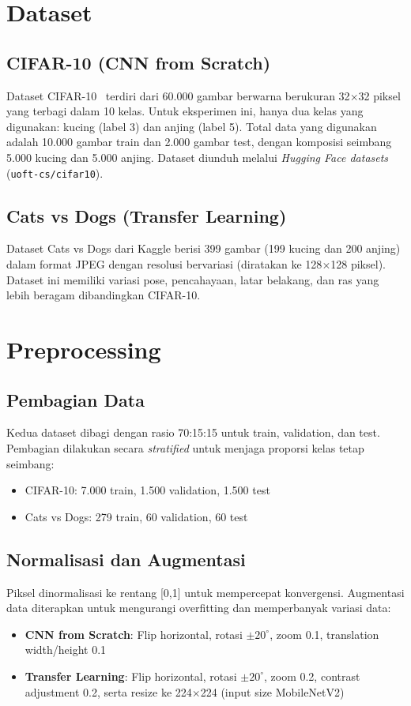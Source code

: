 \documentclass[conference]{IEEEtran}
\begin{document}
\section{Dataset}
\subsection{CIFAR-10 (CNN from Scratch)}
Dataset CIFAR-10~\cite{krizhevsky2009} terdiri dari 60.000 gambar berwarna berukuran 32$\times$32 piksel yang terbagi dalam 10 kelas. Untuk eksperimen ini, hanya dua kelas yang digunakan: kucing (label 3) dan anjing (label 5). Total data yang digunakan adalah 10.000 gambar train dan 2.000 gambar test, dengan komposisi seimbang 5.000 kucing dan 5.000 anjing. Dataset diunduh melalui \textit{Hugging Face datasets} (\texttt{uoft-cs/cifar10}).

\subsection{Cats vs Dogs (Transfer Learning)}
Dataset Cats vs Dogs dari Kaggle berisi 399 gambar (199 kucing dan 200 anjing) dalam format JPEG dengan resolusi bervariasi (diratakan ke 128$\times$128 piksel). Dataset ini memiliki variasi pose, pencahayaan, latar belakang, dan ras yang lebih beragam dibandingkan CIFAR-10.

\section{Preprocessing}
\subsection{Pembagian Data}
Kedua dataset dibagi dengan rasio 70:15:15 untuk train, validation, dan test. Pembagian dilakukan secara \textit{stratified} untuk menjaga proporsi kelas tetap seimbang:
\begin{itemize}
\item CIFAR-10: 7.000 train, 1.500 validation, 1.500 test
\item Cats vs Dogs: 279 train, 60 validation, 60 test
\end{itemize}

\subsection{Normalisasi dan Augmentasi}
Piksel dinormalisasi ke rentang [0,1] untuk mempercepat konvergensi. Augmentasi data diterapkan untuk mengurangi overfitting dan memperbanyak variasi data:
\begin{itemize}
\item \textbf{CNN from Scratch}: Flip horizontal, rotasi $\pm 20^\circ$, zoom 0.1, translation width/height 0.1
\item \textbf{Transfer Learning}: Flip horizontal, rotasi $\pm 20^\circ$, zoom 0.2, contrast adjustment 0.2, serta resize ke 224$\times$224 (input size MobileNetV2)
\end{itemize}
\end{document}

